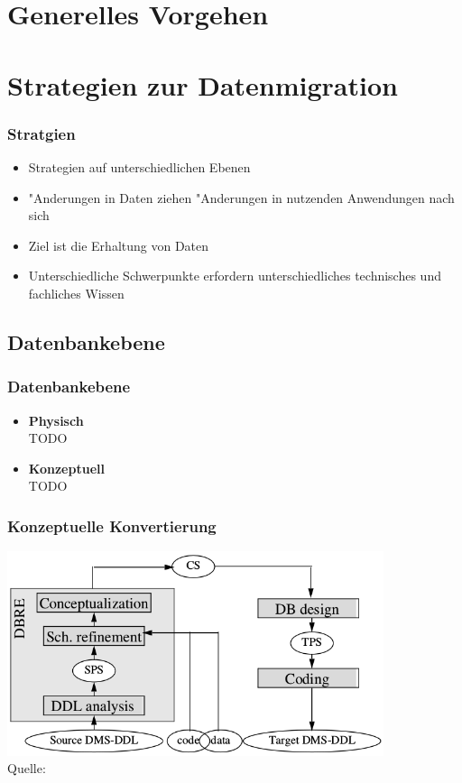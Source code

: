 \documentclass{beamer}
\begin{document}
	\section{Generelles Vorgehen}
	
	\section{Strategien zur Datenmigration}
	
	\begin{frame}
		\frametitle{Stratgien}
		
		\begin{itemize}
			\item Strategien auf unterschiedlichen Ebenen
			\item "Anderungen in Daten ziehen "Anderungen in nutzenden Anwendungen nach sich
			\item Ziel ist die Erhaltung von Daten
			\item Unterschiedliche Schwerpunkte erfordern unterschiedliches technisches und fachliches Wissen
		\end{itemize}
	\end{frame}
	
	\subsection{Datenbankebene}
	
	\begin{frame}
		\frametitle{Datenbankebene}
		
		\begin{itemize}
			\item \textbf{Physisch} \\
			TODO %
			\item \textbf{Konzeptuell} \\
			TODO %
		\end{itemize}
	\end{frame}	
	
	\begin{frame}
		\frametitle{Konzeptuelle Konvertierung}
		
		\centering
		\includegraphics[height = 6cm]{../images/strategies_fig_02b.png}\\
		\tiny Quelle: \cite{henrard-2002}
	\end{frame}
	
\end{document}
